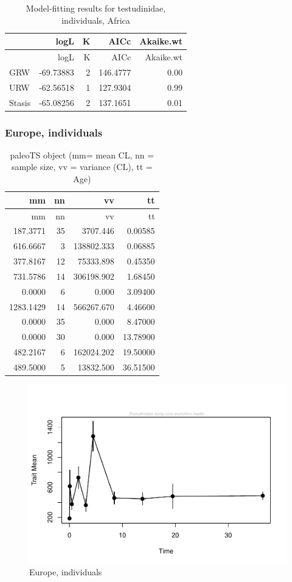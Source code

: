 \documentclass[]{article}
\begin{document}
\begin{longtable}[]{@{}lrrrr@{}}
\caption{Model-fitting results for testudinidae, individuals,
Africa}\tabularnewline
\toprule
& logL & K & AICc & Akaike.wt\tabularnewline
\midrule
\endfirsthead
\toprule
& logL & K & AICc & Akaike.wt\tabularnewline
\midrule
\endhead
GRW & -69.73883 & 2 & 146.4777 & 0.00\tabularnewline
URW & -62.56518 & 1 & 127.9304 & 0.99\tabularnewline
Stasis & -65.08256 & 2 & 137.1651 & 0.01\tabularnewline
\bottomrule
\end{longtable}

\newpage

\subsubsection{Europe, individuals}\label{europe-individuals}

\begin{longtable}[]{@{}rrrr@{}}
\caption{paleoTS object (mm= mean CL, nn = sample size, vv = variance
(CL), tt = Age)}\tabularnewline
\toprule
mm & nn & vv & tt\tabularnewline
\midrule
\endfirsthead
\toprule
mm & nn & vv & tt\tabularnewline
\midrule
\endhead
187.3771 & 35 & 3707.446 & 0.00585\tabularnewline
616.6667 & 3 & 138802.333 & 0.06885\tabularnewline
377.8167 & 12 & 75333.898 & 0.45350\tabularnewline
731.5786 & 14 & 306198.902 & 1.68450\tabularnewline
0.0000 & 6 & 0.000 & 3.09400\tabularnewline
1283.1429 & 14 & 566267.670 & 4.46600\tabularnewline
0.0000 & 35 & 0.000 & 8.47000\tabularnewline
0.0000 & 30 & 0.000 & 13.78900\tabularnewline
482.2167 & 6 & 162024.202 & 19.50000\tabularnewline
489.5000 & 5 & 13832.500 & 36.51500\tabularnewline
\bottomrule
\end{longtable}

\begin{figure}[htbp]
\centering
\includegraphics{MA_JJ_files/figure-latex/paleoTS, individuals, Europe-1.pdf}
\caption{Europe, individuals}
\end{figure}
\end{document}
